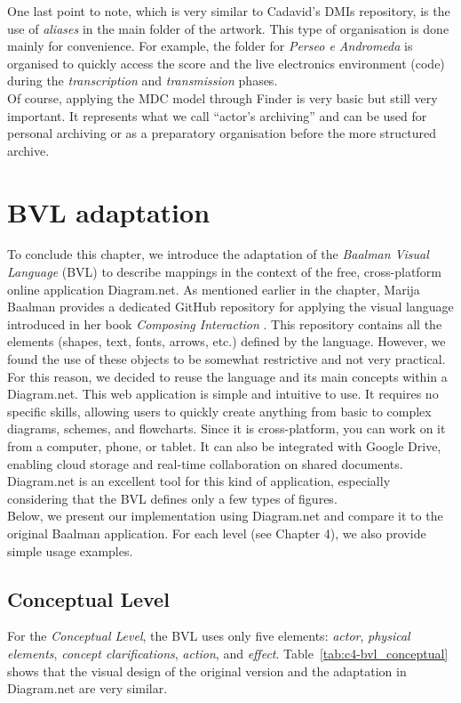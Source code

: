 One last point to note, which is very similar to Cadavid’s DMIs repository, is the use of \textit{aliases} in the main folder of the artwork. This type of organisation is done mainly for convenience. For example, the folder for \textit{Perseo e Andromeda} is organised to quickly access the score and the live electronics environment (code) during the \textit{transcription} and \textit{transmission} phases.\\
Of course, applying the MDC model through Finder is very basic but still very important. It represents what we call ``actor's archiving'' and can be used for personal archiving or as a preparatory organisation before the more structured archive.  

\section{BVL adaptation}
To conclude this chapter, we introduce the adaptation of the \textit{Baalman Visual Language} (BVL) to describe mappings in the context of the free, cross-platform online application Diagram.net. As mentioned earlier in the chapter, Marija Baalman provides a dedicated GitHub repository for applying the visual language introduced in her book \textit{Composing Interaction} \cite{baalman2022composing}. This repository contains all the elements (shapes, text, fonts, arrows, etc.) defined by the language. However, we found the use of these objects to be somewhat restrictive and not very practical. For this reason, we decided to reuse the language and its main concepts within a Diagram.net. This web application is simple and intuitive to use. It requires no specific skills, allowing users to quickly create anything from basic to complex diagrams, schemes, and flowcharts. Since it is cross-platform, you can work on it from a computer, phone, or tablet. It can also be integrated with Google Drive, enabling cloud storage and real-time collaboration on shared documents. Diagram.net is an excellent tool for this kind of application, especially considering that the BVL defines only a few types of figures.\\
Below, we present our implementation using Diagram.net and compare it to the original Baalman application. For each level (see Chapter 4), we also provide simple usage examples.

\subsection{Conceptual Level}
For the \textit{Conceptual Level}, the BVL uses only five elements: \textit{actor}, \textit{physical elements}, \textit{concept clarifications}, \textit{action}, and \textit{effect}. Table~\ref{tab:c4-bvl_conceptual} shows that the visual design of the original version and the adaptation in Diagram.net are very similar.

